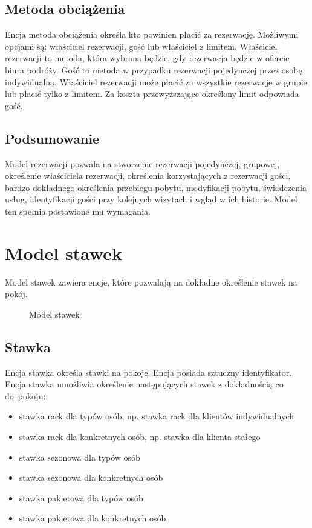 \documentclass[a4paper,onecolumn,oneside,11pt,wide,floatssmall]{mwrep}
\theoremstyle{definition}
\theoremstyle{plain}%
\theoremstyle{remark}
\begin{document}
\subsection{Metoda obciążenia}
Encja metoda obciążenia określa kto powinien płacić za rezerwację. Możliwymi opcjami są: właściciel rezerwacji, gość lub właściciel z limitem. Właściciel rezerwacji to metoda, która wybrana będzie, gdy rezerwacja będzie w ofercie biura podróży. Gość to metoda w przypadku rezerwacji pojedynczej przez osobę indywidualną. Właściciel rezerwacji może płacić za wszystkie rezerwacje w grupie lub płacić tylko z limitem. Za koszta przewyższające określony limit odpowiada gość. 

\subsection{Podsumowanie}
Model rezerwacji pozwala na stworzenie rezerwacji pojedynczej, grupowej, określenie właściciela rezerwacji, określenia korzystających z rezerwacji gości, bardzo dokładnego określenia przebiegu pobytu, modyfikacji pobytu, świadczenia usług, identyfikacji gości przy kolejnych wizytach i wgląd w ich historie. Model ten spełnia postawione mu wymagania.


\section{Model stawek}
Model stawek zawiera encje, które pozwalają na dokładne określenie stawek na pokój. 


\begin{figure}[H]
  \begin{center}
  \end{center}
  \caption{Model stawek}
  \label{fig:db-logical-model-rates}
\end{figure}

\subsection{Stawka}
Encja stawka określa stawki na pokoje. Encja posiada sztuczny identyfikator. Encja stawka umożliwia określenie następujących stawek z dokładnością co \mbox{do pokoju}:

\begin{itemize}
  \item stawka rack dla typów osób, np. stawka rack dla klientów indywidualnych
  \item stawka rack dla konkretnych osób, np. stawka dla klienta stałego
  \item stawka sezonowa dla typów osób
  \item stawka sezonowa dla konkretnych osób
  \item stawka pakietowa dla typów osób
  \item stawka pakietowa dla konkretnych osób
\end{itemize}
\end{document}
